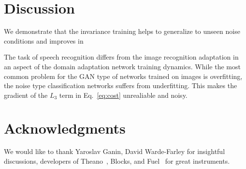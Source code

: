 \documentclass{article}
\begin{document}
\section{Discussion}
    We demonstrate that the invariance training helps to generalize to unseen noise
    conditions and improves in 
    
    The task of speech recognition differs from the image recognition
    adaptation in an aspect of the domain adaptation network training dynamics. 
    While the most common problem for the GAN type of networks trained on images 
    is overfitting, the noise type classification networks suffers from 
    underfitting. This makes the gradient of the $L_3$ term in Eq.~\ref{eq:cost}
    unrealiable and noisy. 


\section*{Acknowledgments}

We would like to thank Yaroslav Ganin, David Warde-Farley for insightful discussions,
developers of Theano~\cite{2016arXiv160502688short}, Blocks, and Fuel~\cite{MerrienboerBDSW15} 
for great instruments.

%


\end{document}

